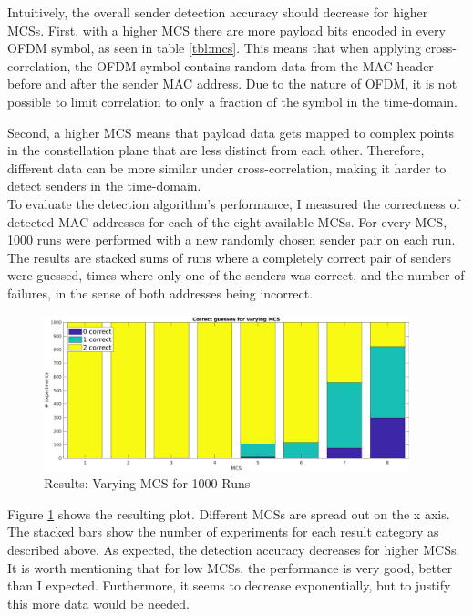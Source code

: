Intuitively, the overall sender detection accuracy should decrease for higher \glspl{MCS}. First, with a higher \gls{MCS} there are more payload bits encoded in every \gls{OFDM} symbol, as seen in table \ref{tbl:mcs}. This means that when applying cross-correlation, the \gls{OFDM} symbol contains random data from the \gls{MAC} header before and after the sender \gls{MAC} address. Due to the nature of \gls{OFDM}, it is not possible to limit correlation to only a fraction of the symbol in the time-domain.

Second, a higher \gls{MCS} means that payload data gets mapped to complex points in the constellation plane that are less distinct from each other. Therefore, different data can be more similar under cross-correlation, making it harder to detect senders in the time-domain.\\

To evaluate the detection algorithm's performance, I measured the correctness of detected \gls{MAC} addresses for each of the eight available \glspl{MCS}. For every \gls{MCS}, 1000 runs were performed with a new randomly chosen sender pair on each run. The results are stacked sums of runs where a completely correct pair of senders were guessed, times where only one of the senders was correct, and the number of failures, in the sense of both addresses being incorrect.

\begin{figure}[H]
	\centering
	\includegraphics[height=4.5cm]{gfx/plots/mcs}
	\caption{Results: Varying MCS for 1000 Runs}
	\label{fig:vary_mcs}
\end{figure}

Figure \ref{fig:vary_mcs} shows the resulting plot. Different \glspl{MCS} are spread out on the x axis. The stacked bars show the number of experiments for each result category as described above. As expected, the detection accuracy decreases for higher \glspl{MCS}. It is worth mentioning that for low \glspl{MCS}, the performance is very good, better than I expected. Furthermore, it seems to decrease exponentially, but to justify this more data would be needed.



